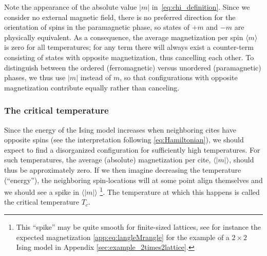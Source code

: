 \documentclass[english,notitlepage,reprint]{revtex4-2}  %
\begin{document}
Note the appearance of the absolute value \(|m|\) in~\eqref{eq:chi_definition}. 
Since we consider no external magnetic field, there is no preferred direction for the orientation of spins in the paramagnetic phase, so states of $+m$ and $-m$ are physically equivalent.
As a consequence, the average magnetization per spin $\langle m \rangle$ is zero for all temperatures; for any term there will always exist a counter-term consisting of states with opposite magnetization, thus cancelling each other. 
To distinguish between the ordered (ferromagnetic) versus unordered (paramagnetic) phases, we thus use \(|m|\) instead of \(m\), so that configurations with opposite magnetization contribute equally rather than canceling.

\subsubsection{The critical temperature}    \label{sec:critical_temperature}
Since the energy of the Ising model increases when neighboring cites have opposite spins (see the interpretation following \eqref{eq:Hamiltonian}), we should expect to find a disorganized configuration for sufficiently high temperatures. For such temperatures, the average (absolute) magnetization per cite, \(\langle |m|\rangle\), should thus be approximately zero. If we then imagine decreasing the temperature (``energy''), the neighboring spin-locations will at some point align themselves and we should see a spike in \(\langle |m|\rangle\) \footnote{This ``spike'' may be quite smooth for finite-sized lattices, see for instance the expected magnetization \eqref{app:eq:langleMrangle} for the example of a \(2\times 2\) Ising model in Appendix \ref{sec:example_2times2lattice}.}. 
The temperature at which this happens is called the critical temperature \(T_c\).  
\end{document}
